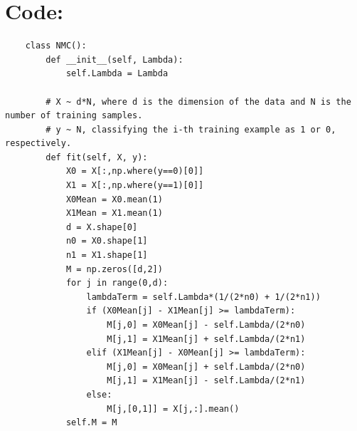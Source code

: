 \documentclass [a4paper] {report}
\begin{document}
	\section*{Code:}
	\begin{lstlisting}
	class NMC():
		def __init__(self, Lambda):
			self.Lambda = Lambda
		
		# X ~ d*N, where d is the dimension of the data and N is the number of training samples.
		# y ~ N, classifying the i-th training example as 1 or 0, respectively.
		def fit(self, X, y):
			X0 = X[:,np.where(y==0)[0]]
			X1 = X[:,np.where(y==1)[0]]
			X0Mean = X0.mean(1)
			X1Mean = X1.mean(1)
			d = X.shape[0]
			n0 = X0.shape[1]
			n1 = X1.shape[1]
			M = np.zeros([d,2])
			for j in range(0,d):
				lambdaTerm = self.Lambda*(1/(2*n0) + 1/(2*n1))
				if (X0Mean[j] - X1Mean[j] >= lambdaTerm):
					M[j,0] = X0Mean[j] - self.Lambda/(2*n0)
					M[j,1] = X1Mean[j] + self.Lambda/(2*n1)
				elif (X1Mean[j] - X0Mean[j] >= lambdaTerm):
					M[j,0] = X0Mean[j] + self.Lambda/(2*n0)
					M[j,1] = X1Mean[j] - self.Lambda/(2*n1)
				else:
					M[j,[0,1]] = X[j,:].mean()
			self.M = M 
	\end{lstlisting}
	
	
\end{document}

